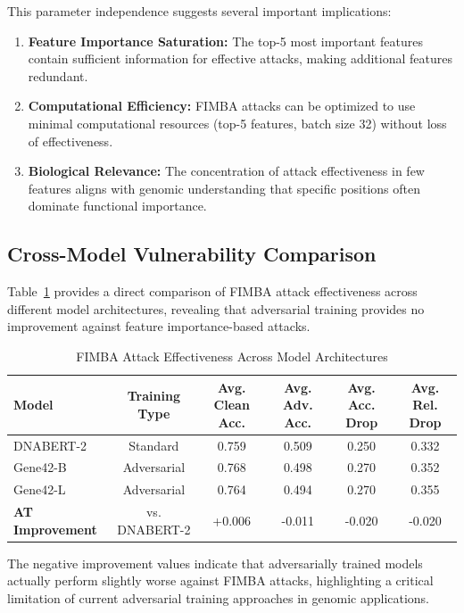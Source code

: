 \documentclass{article} %
\begin{document}
This parameter independence suggests several important implications:

\begin{enumerate}
    \item \textbf{Feature Importance Saturation:} The top-5 most important features contain sufficient information for effective attacks, making additional features redundant.
    
    \item \textbf{Computational Efficiency:} FIMBA attacks can be optimized to use minimal computational resources (top-5 features, batch size 32) without loss of effectiveness.
    
    \item \textbf{Biological Relevance:} The concentration of attack effectiveness in few features aligns with genomic understanding that specific positions often dominate functional importance.
\end{enumerate}

\subsection{Cross-Model Vulnerability Comparison}

Table~\ref{tab:fimba_cross_model} provides a direct comparison of FIMBA attack effectiveness across different model architectures, revealing that adversarial training provides no improvement against feature importance-based attacks.

\begin{table}[h]
\centering
\caption{FIMBA Attack Effectiveness Across Model Architectures}
\label{tab:fimba_cross_model}
\begin{tabular}{lccccc}
\toprule
\textbf{Model} & \textbf{Training Type} & \textbf{Avg. Clean Acc.} & \textbf{Avg. Adv. Acc.} & \textbf{Avg. Acc. Drop} & \textbf{Avg. Rel. Drop} \\
\midrule
DNABERT-2 & Standard & 0.759 & 0.509 & 0.250 & 0.332 \\
Gene42-B & Adversarial & 0.768 & 0.498 & 0.270 & 0.352 \\
Gene42-L & Adversarial & 0.764 & 0.494 & 0.270 & 0.355 \\
\midrule
\textbf{AT Improvement} & vs. DNABERT-2 & +0.006 & -0.011 & -0.020 & -0.020 \\
\bottomrule
\end{tabular}
\end{table}

The negative improvement values indicate that adversarially trained models actually perform slightly worse against FIMBA attacks, highlighting a critical limitation of current adversarial training approaches in genomic applications.
\end{document}
